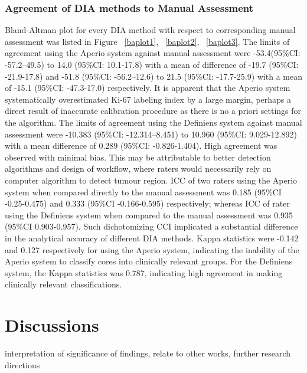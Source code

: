 \documentclass[final,5p,times,twocolumn]{elsarticle}
\begin{document}
\subsubsection*{Agreement of DIA methods to Manual Assessment}

Bland-Altman plot for every DIA method with respect to corresponding manual assessment was listed in Figure ~\ref{baplot1}, ~\ref{baplot2}, ~\ref{baplot3}. The limits of agreement using the Aperio system against manual assessment were -53.4(95\%CI: -57.2--49.5) to 14.0 (95\%CI: 10.1-17.8) with a mean of difference of -19.7 (95\%CI: -21.9-17.8) and -51.8 (95\%CI: -56.2--12.6) to 21.5 (95\%CI: -17.7-25.9) with a mean of -15.1 (95\%CI: -47.3-17.0) respectively. It is apparent that the Aperio system systematically overestimated Ki-67 labeling index by a large margin, perhaps a direct result of inaccurate calibration procedure as there is no a priori settings for the algorithm. The limits of agreement using the Definiens system against manual assessment were -10.383 (95\%CI: -12.314--8.451) to  10.960 (95\%CI:  9.029-12.892) with a mean difference of 0.289 (95\%CI: -0.826-1.404).  High agreement was observed with minimal bias. This may be attributable to better detection algorithms and design of workflow, where raters would necessarily rely on computer algorithm to detect tumour region. ICC of two raters using the Aperio system when compared directly to the manual assessment was 0.185 (95\%CI -0.25-0.475) and 0.333 (95\%CI -0.166-0.595) respectively; whereas ICC of rater using the Definiens system when compared to the manual assessment was 0.935 (95\%CI 0.903-0.957). Such dichotomizing CCI implicated a substantial difference in the analytical accuracy of different DIA methods. Kappa statistics were -0.142 and 0.127 respectively for using the Aperio system, indicating the inability of the Aperio system to classify cores into clinically relevant groups. For the Definiens system, the Kappa statistics was 0.787, indicating high agreement in making clinically relevant classifications.


\section*{Discussions}
interpretation of significance of findings, relate to other works, further research directions

\printbibliography


\newpage
\end{document}
